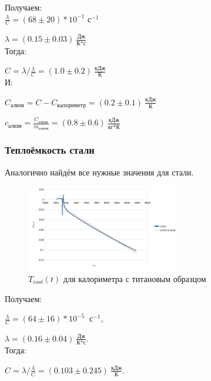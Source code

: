 \documentclass[a4paper]{article}
\begin{document}
    Получаем: \\

    $\frac{\lambda}{C} = (68 \pm 20)*10^{-1} \text{ с}^{-1}$

    $\lambda = (0.15 \pm 0.03)~\frac{\text{Дж}}{\text{К*с}}$\\

    Тогда:

     $C = \lambda / \frac{\lambda}{C} = (1.0 \pm 0.2)~\frac{\text{кДж}}{\text{К}}$  \\

     И:

    $C_\text{алюм} = C - C_\text{калориметр} = (0.2 \pm 0.1)~\frac{\text{кДж}}{\text{К}}$

    $c_\text{алюм} = \frac{C_\text{алюм}}{m_{\text{алюм}}} = (0.8 \pm 0.6)~\frac{\text{кДж}}{\text{кг*К}}$


\subsubsection{Теплоёмкость стали}

    Аналогично найдём все нужные значения для стали.

    \newpage

    \begin{figure}[ht]
        \centering
        \includegraphics[width=0.6\textwidth]{сталь.jpg}
        \caption{$T_{cool}(t)$ для калориметра с титановым образцом}
        \label{plot:T_cool_3}
    \end{figure}

    Получаем:

    $\frac{\lambda}{C} = (64 \pm 16)*10^{-5}~\text{ с}^{-1}$,

    $\lambda = (0.16 \pm 0.04)~\frac{\text{Дж}}{\text{К*с}}$. \\

    Тогда:

    $C = \lambda / \frac{\lambda}{C} = (0.103\pm 0.245)~\frac{\text{кДж}}{\text{К}}$. \\
\end{document}
